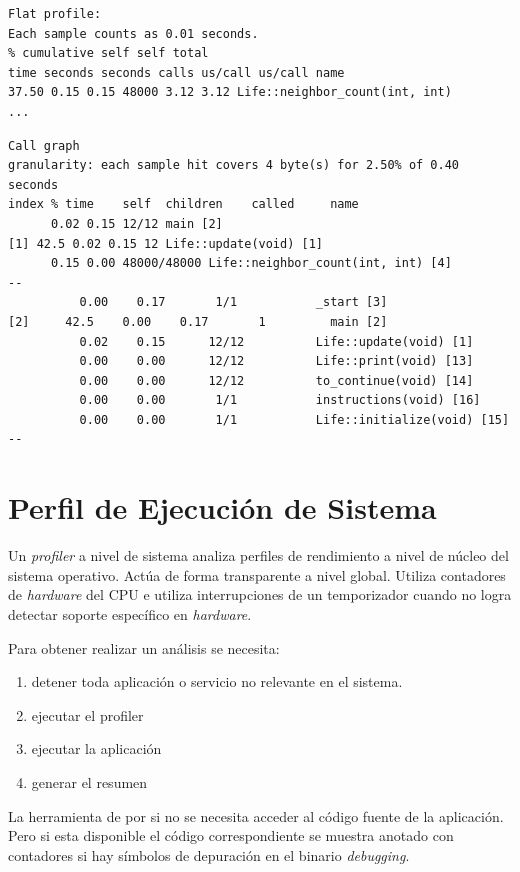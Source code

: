 \documentclass[a4paper]{report}
\begin{document}
\begin{lstlisting} 
Flat profile:
Each sample counts as 0.01 seconds.
% cumulative self self total
time seconds seconds calls us/call us/call name
37.50 0.15 0.15 48000 3.12 3.12 Life::neighbor_count(int, int)
...
\end{lstlisting}

\begin{lstlisting} 
Call graph
granularity: each sample hit covers 4 byte(s) for 2.50% of 0.40 seconds
index % time    self  children    called     name
      0.02 0.15 12/12 main [2]
[1] 42.5 0.02 0.15 12 Life::update(void) [1]
      0.15 0.00 48000/48000 Life::neighbor_count(int, int) [4]
--
          0.00    0.17       1/1           _start [3]
[2]     42.5    0.00    0.17       1         main [2]
          0.02    0.15      12/12          Life::update(void) [1]
          0.00    0.00      12/12          Life::print(void) [13]
          0.00    0.00      12/12          to_continue(void) [14]
          0.00    0.00       1/1           instructions(void) [16]
          0.00    0.00       1/1           Life::initialize(void) [15]
--
\end{lstlisting}

\section{Perfil de Ejecución de Sistema}

Un {\it profiler} a nivel de sistema analiza perfiles de rendimiento a nivel de núcleo del
sistema operativo. Actúa de forma transparente a nivel global. Utiliza
contadores de {\it hardware} del CPU e utiliza interrupciones de un temporizador
cuando no logra detectar soporte específico en {\it hardware}.

Para obtener realizar un análisis se necesita:

\begin{enumerate}
\item detener toda aplicación o servicio no relevante en el sistema.
\item ejecutar el profiler
\item ejecutar la aplicación
\item generar el resumen
\end{enumerate}

La herramienta de por si no se necesita acceder al código fuente de la aplicación.
Pero si esta disponible el código correspondiente se muestra anotado con contadores
si hay símbolos de depuración en el binario {\it debugging}.
\end{document}
